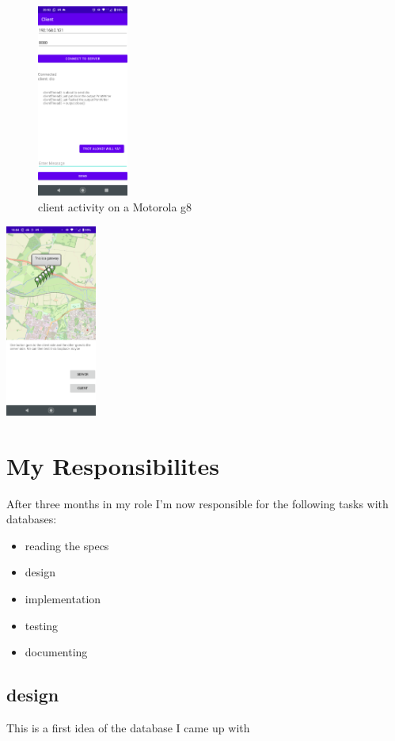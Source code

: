 \documentclass[a4paper,12pt]{article}
\begin{document}
\begin{figure}
\includegraphics[width=3cm]{./client_g8.PNG}
\caption{client activity on a Motorola g8}\label{wrap-fig:4}
\end{figure}



\includegraphics[width=3cm]{./current_status_g8.PNG}


\section{My Responsibilites}

After three months in my role I'm now responsible for the following tasks with databases:

\begin{itemize}
\item {reading the specs}
\item design
\item implementation
\item testing 
\item documenting
\end{itemize}

\clearpage

\subsection{design}
This is a first idea of the database I came up with
\end{document}

